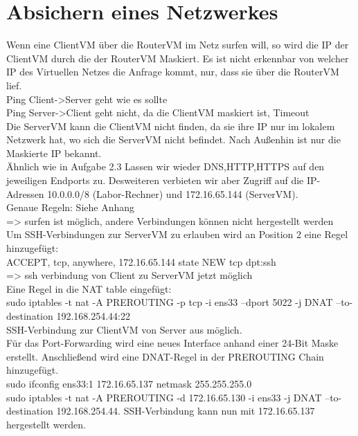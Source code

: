 \documentclass[12pt]{article}
\theoremstyle{plain}
\begin{document}
\section{Absichern eines Netzwerkes}
Wenn eine ClientVM über die RouterVM im Netz surfen will, so wird die IP der ClientVM durch die der RouterVM Maskiert. Es ist nicht erkennbar von welcher IP des Virtuellen Netzes die Anfrage kommt, nur, dass sie über die RouterVM lief.\\
Ping Client->Server geht wie es sollte\\
Ping Server->Client geht nicht, da die ClientVM maskiert ist, Timeout\\
Die ServerVM kann die ClientVM nicht finden, da sie ihre IP nur im lokalem Netzwerk hat, wo sich die ServerVM nicht befindet. Nach Außenhin ist nur die Maskierte IP bekannt.\\
Ähnlich wie in Aufgabe 2.3 Lassen wir wieder DNS,HTTP,HTTPS auf den jeweiligen Endports zu. Desweiteren verbieten wir aber Zugriff auf die IP-Adressen 10.0.0.0/8 (Labor-Rechner) und 172.16.65.144 (ServerVM).\\
Genaue Regeln: Siehe Anhang\\
=> surfen ist möglich, andere Verbindungen können nicht hergestellt werden\\
Um SSH-Verbindungen zur ServerVM zu erlauben wird an Position 2 eine Regel hinzugefügt:\\
ACCEPT, tcp, anywhere, 172.16.65.144 state NEW tcp dpt:ssh\\
=> ssh verbindung von Client zu ServerVM jetzt möglich\\
Eine Regel in die NAT table eingefügt:\\
sudo iptables -t nat -A PREROUTING -p tcp -i ens33 --dport 5022 -j DNAT --to-destination 192.168.254.44:22\\
SSH-Verbindung zur ClientVM von Server aus möglich.\\
Für das Port-Forwarding wird eine neues Interface anhand einer 24-Bit Maske erstellt. Anschließend wird eine DNAT-Regel in der PREROUTING Chain hinzugefügt.\\
sudo ifconfig ens33:1 172.16.65.137 netmask 255.255.255.0\\
sudo iptables -t nat -A PREROUTING -d 172.16.65.130 -i ens33 -j DNAT --to-destination 192.168.254.44.
SSH-Verbindung kann nun mit 172.16.65.137 hergestellt werden.
\end{document}
